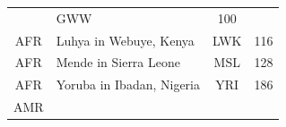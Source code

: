 \documentclass[]{book}
\theoremstyle{definition}
\theoremstyle{definition}
\theoremstyle{definition}
\theoremstyle{remark}
\begin{document}
\begin{longtable}[]{@{}clcc@{}}
\begin{minipage}[t]{0.59\columnwidth}
\end{minipage} & \begin{minipage}[t]{0.09\columnwidth}\centering\strut
GWW\strut
\end{minipage} & \begin{minipage}[t]{0.07\columnwidth}\centering\strut
100\strut
\end{minipage}\tabularnewline
\begin{minipage}[t]{0.14\columnwidth}\centering\strut
AFR\strut
\end{minipage} & \begin{minipage}[t]{0.59\columnwidth}\raggedright\strut
Luhya in Webuye, Kenya\strut
\end{minipage} & \begin{minipage}[t]{0.09\columnwidth}\centering\strut
LWK\strut
\end{minipage} & \begin{minipage}[t]{0.07\columnwidth}\centering\strut
116\strut
\end{minipage}\tabularnewline
\begin{minipage}[t]{0.14\columnwidth}\centering\strut
AFR\strut
\end{minipage} & \begin{minipage}[t]{0.59\columnwidth}\raggedright\strut
Mende in Sierra Leone\strut
\end{minipage} & \begin{minipage}[t]{0.09\columnwidth}\centering\strut
MSL\strut
\end{minipage} & \begin{minipage}[t]{0.07\columnwidth}\centering\strut
128\strut
\end{minipage}\tabularnewline
\begin{minipage}[t]{0.14\columnwidth}\centering\strut
AFR\strut
\end{minipage} & \begin{minipage}[t]{0.59\columnwidth}\raggedright\strut
Yoruba in Ibadan, Nigeria\strut
\end{minipage} & \begin{minipage}[t]{0.09\columnwidth}\centering\strut
YRI\strut
\end{minipage} & \begin{minipage}[t]{0.07\columnwidth}\centering\strut
186\strut
\end{minipage}\tabularnewline
\begin{minipage}[t]{0.14\columnwidth}\centering\strut
AMR\strut
\end{minipage} & \begin{minipage}[t]{0.59\columnwidth}\raggedright\strut

\end{minipage}
\end{longtable}
\end{document}
